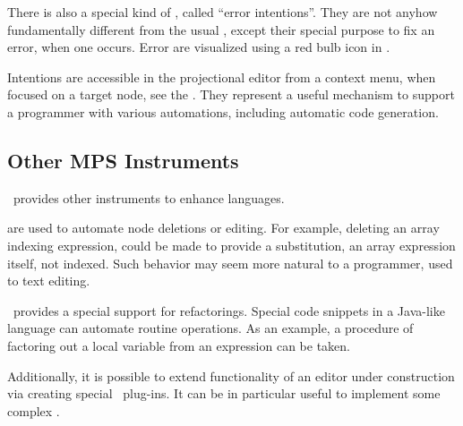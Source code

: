There is also a special kind of , called ``error intentions''. They are not anyhow fundamentally different 
from the usual , except their special purpose to fix an error, when one occurs. 
Error  are visualized using a red bulb icon in \jbmps.

Intentions are accessible in the projectional editor from a context menu, when focused on a target node, see the . They represent 
a useful mechanism to support a programmer with various automations, including automatic code generation.


\subsection{Other MPS Instruments}
\label{othermpsinstruments}

\jbmps\ provides other instruments to enhance languages. 

 are used to automate node deletions or editing. For example, deleting an array indexing expression, could be made
to provide a substitution, an array expression itself, not indexed. Such behavior may seem more natural to a programmer, used to text editing.

\jbmps\ provides a special support for refactorings. Special code snippets in a Java-like language can automate routine operations.
As an example, a procedure of factoring out a local variable from an expression can be taken.

Additionally, it is possible to extend functionality of an editor under construction via creating special \jbmps\ plug-ins. 
It can be in particular useful to implement some complex .